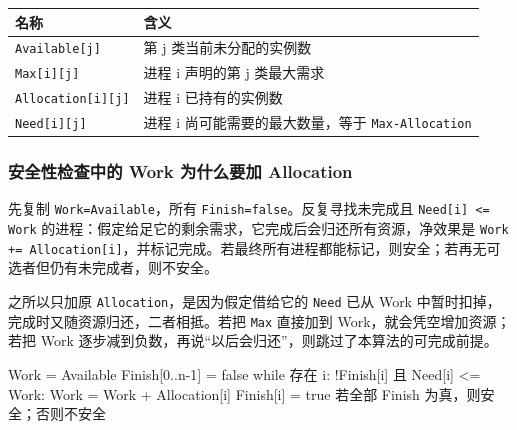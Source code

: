 \begin{wideblock}

\par\medskip\noindent\begin{minipage}{\linewidth}\fontsize{9.3}{12}\selectfont\begin{tabularx}{\linewidth}{@{}YY@{}}
\toprule\noalign{}
名称 & 含义 \\
\midrule\noalign{}


\texttt{Available[\allowbreak{}j]\allowbreak{}} & 第 j 类当前未分配的实例数 \\
\texttt{Max[\allowbreak{}i]\allowbreak{}[\allowbreak{}j]\allowbreak{}} & 进程 i 声明的第 j 类最大需求 \\
\texttt{Allocation[\allowbreak{}i]\allowbreak{}[\allowbreak{}j]\allowbreak{}} & 进程 i 已持有的实例数 \\
\texttt{Need[\allowbreak{}i]\allowbreak{}[\allowbreak{}j]\allowbreak{}} & 进程 i 尚可能需要的最大数量，等于 \texttt{Max-Allocation} \\
\bottomrule\end{tabularx}
\end{minipage}\par\medskip

\end{wideblock}

\subsubsection{安全性检查中的 Work 为什么要加 Allocation}\label{OS02-auto-26}

先复制 \texttt{Work=\allowbreak{}Available}，所有 \texttt{Finish=\allowbreak{}false}。反复寻找未完成且 \texttt{Need[\allowbreak{}i]\allowbreak{} <\allowbreak{}=\allowbreak{} Work} 的进程：假定给足它的剩余需求，它完成后会归还所有资源，净效果是 \texttt{Work +\allowbreak{}=\allowbreak{} Allocation[\allowbreak{}i]\allowbreak{}}，并标记完成。若最终所有进程都能标记，则安全；若再无可选者但仍有未完成者，则不安全。

之所以只加原 \texttt{Allocation}，是因为假定借给它的 \texttt{Need} 已从 Work 中暂时扣掉，完成时又随资源归还，二者相抵。若把 \texttt{Max} 直接加到 Work，就会凭空增加资源；若把 Work 逐步减到负数，再说``以后会归还''，则跳过了本算法的可完成前提。

\par\medskip\noindent\begin{minipage}{\linewidth}
\begin{codeblock}[language={}]
Work = Available
Finish[0..n-1] = false
while 存在 i: !Finish[i] 且 Need[i] <= Work:
    Work = Work + Allocation[i]
    Finish[i] = true
若全部 Finish 为真，则安全；否则不安全
\end{codeblock}
\end{minipage}\par\medskip

